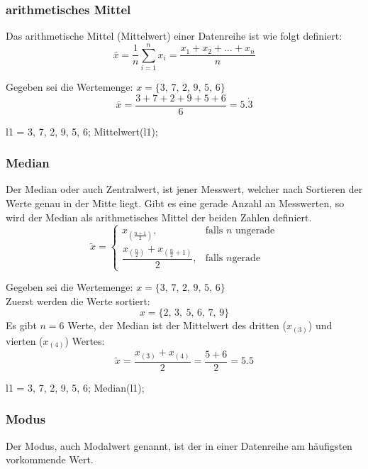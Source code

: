 \pagebreak
\subsubsection*{arithmetisches Mittel}
Das arithmetische Mittel (Mittelwert) einer Datenreihe ist wie folgt definiert:
\begin{equation}
\bar{x} = \frac{1}{n} \sum_{i=1}^{n} x_i = \frac{x_1 + x_2 + \dots + x_n}{n}
\end{equation}
\begin{bsp}
Gegeben sei die Wertemenge: \( x = \{3,\, 7,\, 2,\, 9,\, 5,\, 6 \} \) \\
\[
    \bar{x} = \frac{3+7+2+9+5+6}{6} = 5.\dot{3}
\]
\begin{geogebracode}
    l1 = { 3, 7, 2, 9, 5, 6};
    Mittelwert(l1);
\end{geogebracode}
\end{bsp}
\subsubsection*{Median}
Der Median oder auch Zentralwert, ist jener Messwert, welcher nach Sortieren der Werte genau in der Mitte liegt. Gibt es eine gerade Anzahl an Messwerten, so wird der Median als arithmetisches Mittel der beiden Zahlen definiert.
\begin{equation}
    \tilde{x} =
    \begin{cases}
        x_{\left(\frac{n+1}{2}\right)}, & \text{falls } n \text{ ungerade} \\[1em]
        \dfrac{x_{\left(\frac{n}{2}\right)} + x_{\left(\frac{n}{2}+1\right)}}{2}, & \text{falls } n \text{gerade}
    \end{cases}
\end{equation}

\begin{bsp}
Gegeben sei die Wertemenge: \( x = \{3,\, 7,\, 2,\, 9,\, 5,\, 6 \} \) \\
Zuerst werden die Werte sortiert:
\[
    x = \{2,\, 3,\ 5,\, 6,\, 7,\, 9 \} 
\]
Es gibt $n=6$ Werte, der Median ist der Mittelwert des dritten (\(x_{(3)}\)) und vierten (\(x_{(4)}\)) Wertes:
\[
    \tilde{x} = \frac{x_{(3)}+x_{(4)}}{2} = \frac{5+6}{2} = 5.5
\]
\begin{geogebracode}
    l1 = { 3, 7, 2, 9, 5, 6};
    Median(l1);
\end{geogebracode}
\end{bsp}

\subsubsection*{Modus}
Der Modus, auch Modalwert genannt, ist der in einer Datenreihe am häufigsten vorkommende Wert.
